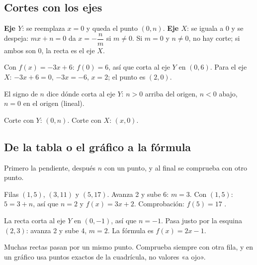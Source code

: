 \subsection{Cortes con los ejes}
\begin{clave}[Cortes] \textbf{Eje $Y$}: se reemplaza $x = 0$ y queda el punto $(0, n)$. \textbf{Eje $X$}: se iguala a $0$ y se despeja: $mx + n = 0$ da $x = -\dfrac{n}{m}$ si $m \neq 0$. Si $m = 0$ y $n \neq 0$, no hay corte; si ambos son $0$, la recta es el eje $X$.\end{clave}
\par\noindent\begin{minipage}{0.55\linewidth}
\begin{ejemplo} Con $f(x) = -3x + 6$: $f(0) = 6$, así que corta al eje $Y$ en $(0, 6)$. Para el eje $X$: $-3x + 6 = 0$, $-3x = -6$, $x = 2$; el punto es $(2, 0)$.\end{ejemplo}
El signo de $n$ dice dónde corta al eje $Y$: $n > 0$ arriba del origen, $n < 0$ abajo, $n = 0$ en el origen (lineal).
\begin{ojo} Corte con $Y$: $(0, n)$. Corte con $X$: $(x, 0)$.\end{ojo}
\end{minipage}\hfill
\begin{minipage}{0.4\linewidth}\centering
{}
\end{minipage}

\subsection{De la tabla o el gráfico a la fórmula}
Primero la pendiente, después $n$ con un punto, y al final se comprueba con otro punto.
\begin{ejemplo} Filas $(1, 5)$, $(3, 11)$ y $(5, 17)$. Avanza 2 y sube 6: $m = 3$. Con $(1, 5)$: $5 = 3 + n$, así que $n = 2$ y $f(x) = 3x + 2$. Comprobación: $f(5) = 17$ \checkmark.\end{ejemplo}
\begin{ejemplo} La recta corta al eje $Y$ en $(0, -1)$, así que $n = -1$. Pasa justo por la esquina $(2, 3)$: avanza 2 y sube 4, $m = 2$. La fórmula es $f(x) = 2x - 1$.\end{ejemplo}
\begin{ojo} Muchas rectas pasan por un mismo punto. Comprueba siempre con otra fila, y en un gráfico usa puntos exactos de la cuadrícula, no valores «a ojo».\end{ojo}

